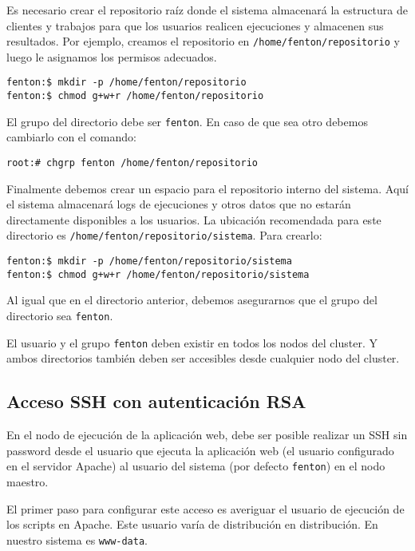 \documentclass[a4paper,10pt,spanish]{article}
\begin{document}
Es necesario crear el repositorio ra\'{i}z donde el sistema almacenar\'{a} la estructura de clientes y trabajos para que los usuarios realicen ejecuciones y almacenen sus resultados. Por ejemplo, creamos el repositorio en \mbox{\texttt{/home/fenton/repositorio}} y luego le asignamos los permisos adecuados.

\begin{verbatim}
fenton:$ mkdir -p /home/fenton/repositorio
fenton:$ chmod g+w+r /home/fenton/repositorio
\end{verbatim}

El grupo del directorio debe ser \mbox{\texttt{fenton}}. En caso de que sea otro debemos cambiarlo con el comando:

\begin{verbatim}
root:# chgrp fenton /home/fenton/repositorio
\end{verbatim}

Finalmente debemos crear un espacio para el repositorio interno del sistema. Aqu\'{i} el sistema almacenar\'{a} logs de ejecuciones y otros datos que no estar\'{a}n directamente disponibles a los usuarios. La ubicaci\'{o}n recomendada para este directorio es \mbox{\texttt{/home/fenton/repositorio/sistema}}. Para crearlo:

\begin{verbatim}
fenton:$ mkdir -p /home/fenton/repositorio/sistema
fenton:$ chmod g+w+r /home/fenton/repositorio/sistema
\end{verbatim}

Al igual que en el directorio anterior, debemos asegurarnos que el grupo del directorio sea \mbox{\texttt{fenton}}.

El usuario y el grupo \mbox{\texttt{fenton}} deben existir en todos los nodos del cluster. Y ambos directorios tambi\'{e}n deben ser accesibles desde cualquier nodo del cluster.

\subsection{Acceso SSH con autenticaci\'{o}n RSA}

En el nodo de ejecuci\'{o}n de la aplicaci\'{o}n web, debe ser posible realizar un SSH sin password desde el usuario que ejecuta la aplicaci\'{o}n web (el usuario configurado en el servidor Apache) al usuario del sistema (por defecto \mbox{\texttt{fenton}}) en el nodo maestro. 

El primer paso para configurar este acceso es averiguar el usuario de ejecuci\'{o}n de los scripts en Apache. Este usuario var\'{i}a de distribuci\'{o}n en distribuci\'{o}n. En nuestro sistema es \mbox{\texttt{www-data}}.
\end{document}
